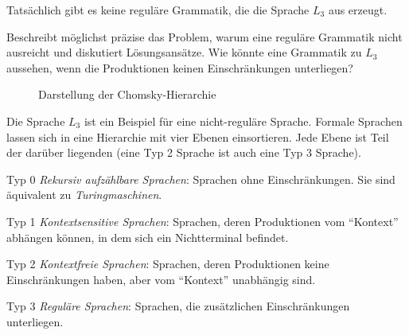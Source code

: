 \documentclass[fontsize=10pt, a4paper, ngerman]{scrartcl}
\begin{document}
\begin{aufgabe}[icon=\iconPartner]
\label{aufg:grammatik-erweitern}
Tatsächlich gibt es keine reguläre Grammatik, die die Sprache $L_3$
aus  erzeugt.

Beschreibt möglichst präzise das Problem, warum eine reguläre
Grammatik nicht ausreicht und diskutiert Lösungsansätze. Wie könnte
eine Grammatik zu $L_3$ aussehen, wenn die Produktionen keinen
Einschränkungen unterliegen?
\end{aufgabe}

\hrulefill

\begin{wrapfix}
\begin{wrapfigure}[12]{r}{0pt}
\caption*{Darstellung der Chomsky-Hierarchie}
\label{abb:chomsky}
\end{wrapfigure}
Die Sprache $L_3$ ist ein Beispiel für eine nicht-reguläre Sprache.
Formale Sprachen lassen sich in eine Hierarchie mit vier Ebenen
einsortieren. Jede Ebene ist Teil der darüber liegenden (eine Typ 2
Sprache ist auch eine Typ 3 Sprache).

\begin{smallitem}
	\item[Typ 0] \emph{Rekursiv aufzählbare Sprachen}: Sprachen ohne
		Einschränkungen. Sie sind äquivalent zu \emph{Turingmaschinen}.
	\item[Typ 1] \emph{Kontextsensitive Sprachen}: Sprachen, deren
		Produktionen vom \enquote{Kontext} abhängen können, in dem sich
		ein Nichtterminal befindet.
	\item[Typ 2] \emph{Kontextfreie Sprachen}: Sprachen, deren Produktionen
		keine Einschränkungen haben, aber vom \enquote{Kontext}
		unabhängig sind.
	\item[Typ 3] \emph{Reguläre Sprachen}: Sprachen, die zusätzlichen
		Einschränkungen unterliegen.
\end{smallitem}
\end{wrapfix}
\end{document}
